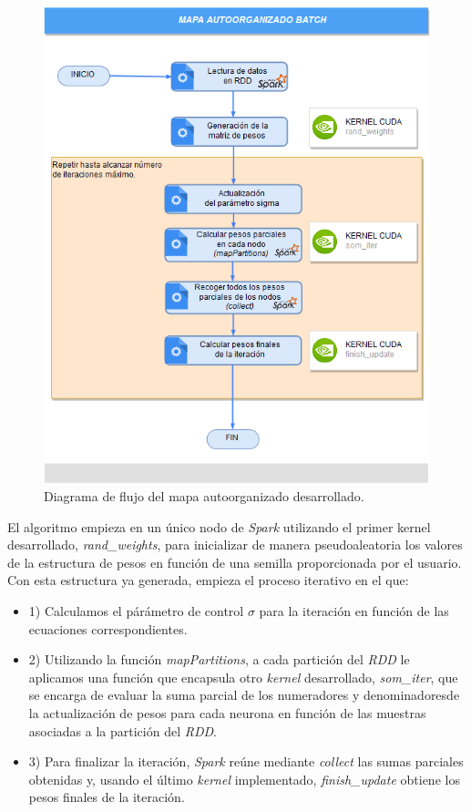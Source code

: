 \begin{figure}[ht]
\centering
\includegraphics[scale=0.5]{imagenes/flujosparksom.png}
\caption{Diagrama de flujo del mapa autoorganizado desarrollado.}
\label{image:flujosparksom}
\end{figure}

El algoritmo empieza en un único nodo de \textit{Spark} utilizando el primer kernel desarrollado, \textit{rand\_weights}, para inicializar de manera pseudoaleatoria los valores de la estructura de pesos en función de una semilla proporcionada por el usuario. Con esta estructura ya generada, empieza el proceso iterativo en el que:
\begin{itemize}
    \item 1) Calculamos el párámetro de control $\sigma$ para la iteración en función de las ecuaciones correspondientes.
    \item 2) Utilizando la función \textit{mapPartitions}, a cada partición del \textit{RDD} le aplicamos una función que encapsula otro \textit{kernel} desarrollado, \textit{som\_iter}, que se encarga de evaluar la suma parcial de los numeradores y denominadoresde la actualización de pesos para cada neurona en función de las muestras asociadas a la partición del \textit{RDD}.
    \item 3) Para finalizar la iteración, \textit{Spark} reúne mediante \textit{collect} las sumas parciales obtenidas y, usando el último \textit{kernel} implementado, \textit{finish\_update} obtiene los pesos finales de la iteración.
\end{itemize}

